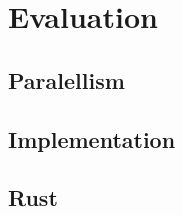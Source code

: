 \chapter{Evaluation}\label{chap:eval}
\section{Paralellism}
\section{Implementation}
\section{Rust}
